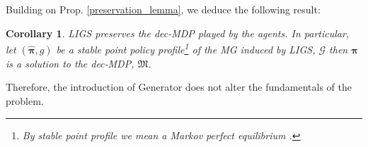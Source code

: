 \documentclass{article}
\newtheorem{corollary}{Corollary}
\begin{document}
Building on Prop. \ref{preservation_lemma}, we deduce the following result:
\begin{corollary}\label{invariance_prop}
LIGS preserves the dec-MDP played by the agents. In particular, let $(\boldsymbol{\hat{\pi}},g)$ be a stable point policy profile\footnote{By stable point profile we mean 
a Markov perfect equilibrium \cite{fudenberg1991tirole}.} of the MG induced by LIGS, $\mathcal{G}$ then $\boldsymbol{\hat{\pi}}$ is a solution to the dec-MDP, $\mathfrak{M}$. 
\end{corollary}
Therefore, the introduction of {\selectfont Generator} does not alter the fundamentals of the problem. 
% 
% 
% 
% 
% 
% 
% 
% 
\end{document}
